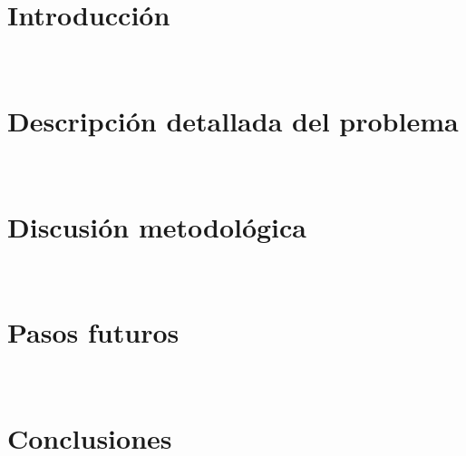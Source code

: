 \documentclass[spanish]{pucthesis}
\renewcommand{\cleardoublepage}{\par}
\begin{document}


\newpage

\chapter{Introducción}
 \\

\vspace{0.5cm}

\chapter{Descripción detallada del problema} \label{sec2}
 \\

\vspace{0.5cm}

\chapter{Discusión metodológica} \label{sec3}
 \\

\vspace{0.5cm}

\chapter{Pasos futuros} \label{sec4}
 \\

\vspace{0.5cm}

\chapter{Conclusiones} \label{sec5}


\newpage


\cleardoublepage
{} \label{references}

\renewcommand{\bibname}{BIBLIOGRAFÍA}


\end{document}
